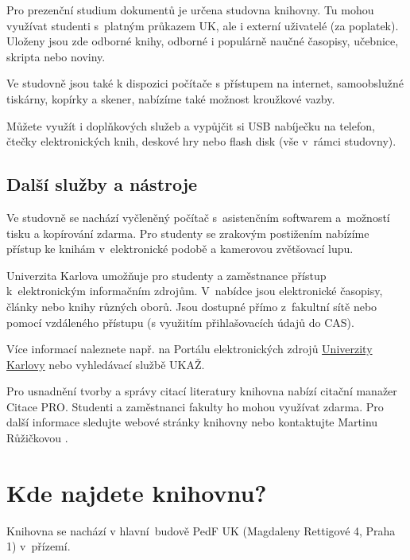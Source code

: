 Pro prezenční studium dokumentů je určena studovna knihovny. Tu mohou
využívat studenti s~platným průkazem UK, ale i externí uživatelé (za
poplatek). Uloženy jsou zde odborné knihy, odborné i populárně naučné
časopisy, učebnice, skripta nebo noviny.

Ve studovně jsou také k dispozici počítače s přístupem na internet,
samoobslužné tiskárny, kopírky a skener, nabízíme také možnost kroužkové
vazby.

Můžete využít i doplňkových služeb a vypůjčit si USB nabíječku na
telefon, čtečky elektronických knih, deskové hry nebo flash disk (vše
v~rámci studovny).

\subsection{Další služby a
nástroje}


Ve studovně se nachází vyčleněný počítač s~asistenčním softwarem
a~možností tisku a kopírování zdarma. Pro studenty se zrakovým
postižením nabízíme přístup ke knihám v~elektronické podobě a kamerovou
zvětšovací lupu.


Univerzita Karlova umožňuje pro studenty a zaměstnance přístup
k~elektronickým informačním zdrojům. V~nabídce jsou elektronické
časopisy, články nebo knihy různých oborů. Jsou dostupné přímo
z~fakultní sítě nebo pomocí vzdáleného přístupu (s využitím
přihlašovacích údajů do CAS).

Více informací naleznete např. na Portálu elektronických zdrojů
{\href{http://pez.cuni.cz}{Univerzity Karlovy}} nebo vyhledávací
službě UKAŽ.


Pro usnadnění tvorby a správy citací literatury knihovna nabízí citační
manažer Citace PRO. Studenti a zaměstnanci fakulty ho mohou využívat
zdarma. Pro další informace sledujte webové stránky knihovny nebo
kontaktujte Martinu Růžičkovou
.

\section{Kde najdete knihovnu?}

Knihovna se nachází v hlavní~budově PedF UK (Magdaleny Rettigové 4,
Praha 1) v~přízemí.

